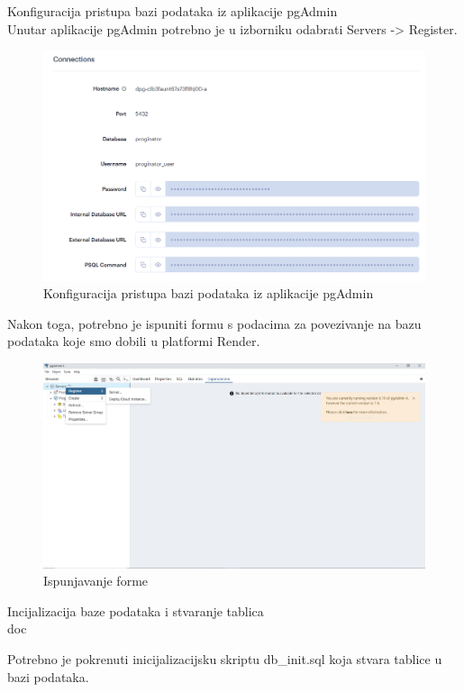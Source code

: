 \begin{packed_item}
		\item Konfiguracija pristupa bazi podataka iz aplikacije pgAdmin \\
		Unutar aplikacije pgAdmin potrebno je u izborniku odabrati Servers -> Register.
		
		\begin{figure}[H]
			\includegraphics[width=\textwidth]{slike/Baza_podataka2.PNG} %
			\caption{Konfiguracija pristupa bazi podataka iz aplikacije pgAdmin}
			\label{fig:bazapodataka2} %
		\end{figure}
		
		Nakon toga, potrebno je ispuniti formu s podacima za povezivanje na bazu podataka koje smo dobili u platformi Render.
		\begin{figure}[H]
			\includegraphics[width=\textwidth]{slike/Baza_podataka3.PNG} %
			\caption{Ispunjavanje forme}
			\label{fig:bazapodataka3} %
		\end{figure}
		
        \item Incijalizacija baze podataka i stvaranje tablica \\doc
        
        Potrebno je pokrenuti inicijalizacijsku skriptu db\_init.sql koja stvara tablice u bazi podataka.

    				
	 \end{packed_item}


